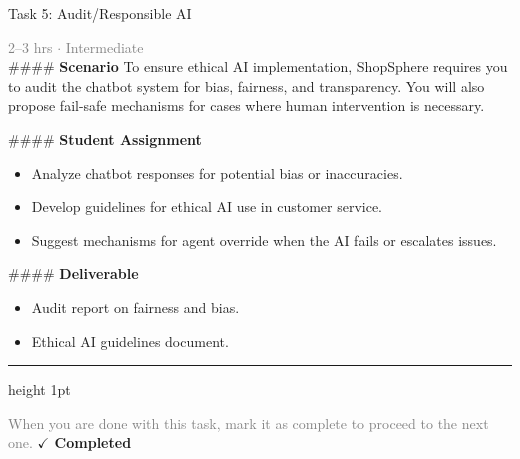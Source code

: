 \documentclass[10pt,a4paper]{article}
\begin{document}
\begin{taskbox}{Task 5: Audit/Responsible AI}

    {\small \textcolor{gray}{2--3 hrs $\cdot$ Intermediate}}\\[12pt]

    \#\#\#\# \textbf{Scenario}  
To ensure ethical AI implementation, ShopSphere requires you to audit the chatbot system for bias, fairness, and transparency. You will also propose fail-safe mechanisms for cases where human intervention is necessary.  

\#\#\#\# \textbf{Student Assignment}  
\begin{itemize}
    \item Analyze chatbot responses for potential bias or inaccuracies.  
    \item Develop guidelines for ethical AI use in customer service.  
    \item Suggest mechanisms for agent override when the AI fails or escalates issues.  
\end{itemize}

\#\#\#\# \textbf{Deliverable}  
\begin{itemize}
    \item Audit report on fairness and bias.  
    \item Ethical AI guidelines document.\par
\end{itemize}

    \vspace{16pt}

    \textcolor{cardBorder}{\hrule height 1pt}\vspace{8pt}

    \small \textcolor{gray}{When you are done with this task, mark it as complete to proceed to the next one.} \hfill \textbf{\textcolor{brandDark}{$\checkmark$ Completed}}

\end{taskbox}
\end{document}
